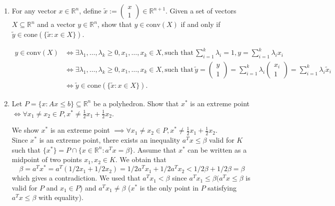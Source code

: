 \documentclass[11pt]{article}
\newcommand{\setR}{\mathbb{R}}
\renewcommand{\leq}{\leqslant}
\renewcommand{\geq}{\geqslant}
\begin{document}
\begin{enumerate}[1)]
\item For any vector $x \in \setR^n$, define $\tilde{x} := \begin{pmatrix} x \\ 1 \end{pmatrix} \in \mathbb{R}^{n+1}$. 
Given a set of vectors $X \subseteq \setR^n$ and a vector $y \in \mathbb{R}^{n}$, show that $y \in \mathrm{conv}(X)$ if and only if $\tilde{y} \in \mathrm{cone}(\{\tilde{x}: x\in X\})$.

\begin{solution}
\begin{align*}
y \in \mathrm{conv}(X) 
&\iff \exists \lambda_1, \dots, \lambda_k \geq 0, x_1, \dots, x_k \in X, \text{such that}\, \sum_{i=1}^k \lambda_i = 1, y = \sum_{i=1}^k \lambda_i x_i\\
&\iff \exists \lambda_1, \dots, \lambda_k \geq 0, x_1, \dots, x_k \in X, \text{such that}\, \tilde{y} = \begin{pmatrix} y \\ 1 \end{pmatrix} = \sum_{i=1}^k \lambda_i \begin{pmatrix} x_i \\ 1 \end{pmatrix} = \sum_{i=1}^k \lambda_i \tilde{x}_i \\
&\iff \tilde{y} \in \mathrm{cone}(\{\tilde{x}: x\in X\}).
\end{align*}
\end{solution}

\item Let $P = \{x: A x \leq b\} \subseteq \setR^n$ be a polyhedron. Show that $x^\ast$ is an extreme point $\iff \forall x_1 \neq x_2 \in P, x^\ast \neq \frac{1}{2}x_1 + \frac{1}{2}x_2$. 


\begin{solution}
We show $x^\ast$ is an extreme point $\implies \forall x_1 \neq x_2 \in P, x^\ast \neq \frac{1}{2}x_1 + \frac{1}{2}x_2$.
\\

Since $x^\ast$ is an extreme point, there exists an inequality $a^T x≤β$ valid for $K$ such that $\{x^\ast\}= P∩\{x∈
\setR^n : a^T x= β\}$. Assume that $x^\ast$ can be written as a midpoint of two points $x_1,x_2∈K$. We obtain
that
$$β= a^T x^\ast= a^T (1/2x_1+ 1/2x_2) = 1/2a^T x_1+ 1/2a^T x_2 <1/2β+ 1/2 β= β$$
which gives a contradiction. We used that $a^T x_1 < β$ since $a^T x_1 ≤β (a^T x ≤β$ is valid for $P$ and $x_1 ∈P$) and $a^T x_1\neq β$ ($x^\ast$ is the only point in $P$ satisfying $a^T x≤β$ with equality).\\




\end{solution}
\end{enumerate}
\end{document}

